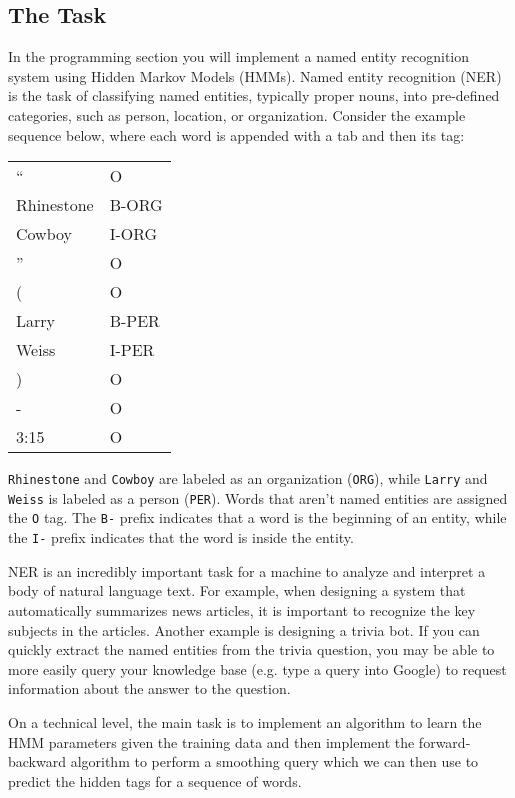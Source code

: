\documentclass[11pt,addpoints,answers]{exam}
\begin{document}
\subsection{The Task}\label{task}
In the programming section you will implement a named entity recognition system using Hidden Markov Models (HMMs). Named entity recognition (NER) is the task of classifying named entities, typically proper nouns,  into pre-defined categories, such as person, location, or organization. Consider the example sequence below, where each word is appended with a tab and then its tag:

\begin{tabular}{ m{3cm}  m{3cm} } 
    `` & O \\
    Rhinestone & B-ORG \\
    Cowboy & I-ORG \\
    '' & O \\
    ( & O \\
    Larry & B-PER \\
    Weiss & I-PER \\
    ) & O \\ 
    - & O \\
    3:15 & O
\end{tabular}

 \texttt{Rhinestone} and \texttt{Cowboy} are labeled as an organization (\texttt{ORG}), while \texttt{Larry} and \texttt{Weiss} is labeled as a person (\texttt{PER}). Words that aren't named entities are assigned the \texttt{O} tag. The \texttt{B-} prefix indicates that a word is the beginning of an entity, while the \texttt{I-} prefix indicates that the word is inside the entity.

NER is an incredibly important task for a machine to analyze and interpret a body of natural language text. For example, when designing a system that automatically summarizes news articles, it is important to recognize the key subjects in the articles. Another example is designing a trivia bot. If you can quickly extract the named entities from the trivia question, you may be able to more easily query your knowledge base (e.g. type a query into Google) to request information about the answer to the question.

On a technical level, the main task is to implement an algorithm to learn the HMM parameters given the training data and then implement the forward-backward algorithm to perform a smoothing query which we can then use to predict the hidden tags for a sequence of words. 
\end{document}
